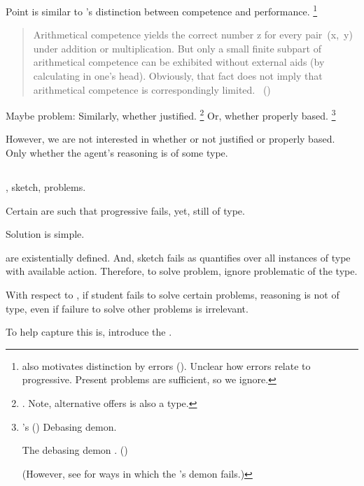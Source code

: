 \begin{note}
  Point is similar to \citeauthor{Chomsky:2015aa}'s distinction between competence and performance.%
  \footnote{
    \citeauthor{Chomsky:2015aa} also motivates distinction by errors (\citeyear[2]{Chomsky:2015aa}).
    Unclear how errors relate to progressive.
    Present problems are sufficient, so we ignore.
  }

  \begin{quote}
    Arithmetical competence yields the correct number z for every pair~(x,~y) under addition or multiplication.
    But only a small finite subpart of arithmetical competence can be exhibited without external aids (by calculating in one's head).
    Obviously, that fact does not imply that arithmetical competence is correspondingly limited.%
    \mbox{ }\hfill\mbox{(\citeyear[xii]{Chomsky:2015aa})}
  \end{quote}
\end{note}

\begin{note}
  Maybe problem:
  Similarly, whether justified.%
  \footnote{
    \citeauthor{Kripke:1982aa}.
    Note, alternative \citeauthor{Kripke:1982aa} offers is also a type.
  }
  Or, whether properly based.%
  \footnote{
    \citeauthor{Schaffer:2010vq}'s (\citeyear{Schaffer:2010vq}) Debasing demon.

    The debasing demon . (\citeyear[231]{Schaffer:2010vq})

    (However, see \textcite{Bondy:2018tk} for ways in which the \citeauthor{Schaffer:2010vq}'s demon fails.)
  }

  However, we are not interested in whether or not justified or properly based.
  Only whether the agent's reasoning is of some type.
\end{note}

\subsection{}

\label{cha:typical:sec:tR:RoToR}

\begin{note}
  \tor{}, sketch, problems.

  Certain  are such that progressive fails, yet, still of type.

  Solution is simple.

   are existentially defined.
  And, sketch fails as quantifies over all instances of type with available action.
  Therefore, to solve problem, ignore problematic  of the type.

  With respect to , if student fails to solve certain problems, reasoning is not of type, even if failure to solve other problems is irrelevant.

  To help capture this is, introduce the \rotor{}.
\end{note}


